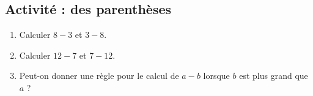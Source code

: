
\subsection*{Activité : des parenthèses}

\begin{enumerate}
    \item
        Calculer \( 8-3\) et \( 3-8\).
    \item
        Calculer \( 12-7\) et \( 7-12\).
    \item
        Peut-on donner une règle pour le calcul de \( a-b\) lorsque \( b\) est plus grand que \( a\) ?
\end{enumerate}

